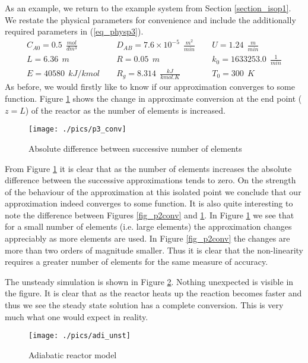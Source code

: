 \documentclass[11pt,fleqn]{article}
\theoremstyle{defstyle}
\begin{document}
As an example, we return to the example system from Section \ref{section_isop1}. We restate the physical parameters for convenience and include the additionally required parameters in (\ref{eq_physp3}).
\begin{equation}
\begin{matrix}
C_{A0} = 0.5~~ \frac{mol}{dm^3} & \phantom{-}D_{AB} = 7.6\times 10^{-5} ~~\frac{m^2}{min} & \phantom{-}U = 1.24~~ \frac{m}{min} \\
L = 6.36~~ m 
& \phantom{-} R = 0.05~~ m
& \phantom{-} k_0 = 1633253.0 ~~ \frac{1}{min} \\
E = 40580 ~~ kJ/kmol
& \phantom{-} R_g = 8.314~~ \frac{kJ}{kmol. K}
& \phantom{-} T_0 = 300 ~~ K
\end{matrix} 
\label{eq_physp3}
\end{equation}
As before, we would firstly like to know if our approximation converges to some function. Figure \ref{fig_p3conv} shows the change in approximate conversion at the end point ($z=L$) of the reactor as the number of elements is increased.
\begin{figure}[H] 
\centering
\texttt{[image: ./pics/p3\_conv]}
\caption{Absolute difference between successive number of elements} 
\label{fig_p3conv}
\end{figure}
From Figure \ref{fig_p3conv} it is clear that as the number of elements increases the absolute difference between the successive approximations tends to zero. On the strength of the behaviour of the approximation at this isolated point we conclude that our approximation indeed converges to some function. It is also quite interesting to note the difference between Figures \ref{fig_p2conv} and \ref{fig_p3conv}. In Figure \ref{fig_p3conv} we see that for a small number of elements (i.e. large elements) the approximation changes appreciably as more elements are used. In Figure \ref{fig_p2conv} the changes are more than two orders of magnitude smaller. Thus it is clear that the non-linearity requires a greater number of elements for the same measure of accuracy. 

The unsteady simulation is shown in Figure \ref{fig_adi_unst}. Nothing unexpected is visible in the figure. It is clear that as the reactor heats up the reaction becomes faster and thus we see the steady state solution has a complete conversion. This is very much what one would expect in reality.
\begin{figure}[H] 
\centering
\texttt{[image: ./pics/adi\_unst]}
\caption{Adiabatic reactor model} 
\label{fig_adi_unst}
\end{figure}
\end{document}
